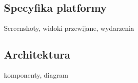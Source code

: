 \subsection{Specyfika platformy}
Screenshoty, widoki przewijane, wydarzenia

\subsection{Architektura}

komponenty, diagram
